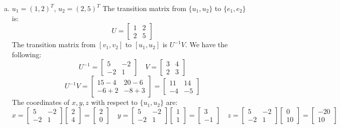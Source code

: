 \documentclass{article}
\begin{document}
\begin{enumerate}[(a)]
    \item
    $u_1 = (1,2)^T$, $u_2 = (2,5)^T$
    The transition matrix from $\{u_1, u_2\}$ to $\{e_1, e_2\}$ is:
    $$ U = \begin{bmatrix} 1 & 2 \\ 2 & 5 \end{bmatrix} $$
    The transition matrix from $[v_1, v_2]$ to $[u_1, u_2]$ is $U^{-1}V$.
    We have the following:
    $$ U^{-1} = \begin{bmatrix} 5 & -2 \\ -2 & 1 \end{bmatrix} \quad
    V = \begin{bmatrix} 3 & 4 \\ 2 & 3 \end{bmatrix} $$
    $$ U^{-1}V = \begin{bmatrix} 15-4 & 20-6 \\ -6+2 & -8+3 \end{bmatrix} = 
    \begin{bmatrix} 11 & 14 \\ -4 & -5 \end{bmatrix} $$
    The coordinates of $x, y, z$ with respect to $\{u_1, u_2\}$ are:
    $$
    x = \begin{bmatrix} 5 & -2 \\ -2 & 1 \end{bmatrix} \begin{bmatrix} 2 \\ 4 \end{bmatrix}
     = \begin{bmatrix} 2 \\ 0 \end{bmatrix}
    \quad
    y = \begin{bmatrix} 5 & -2 \\ -2 & 1 \end{bmatrix} \begin{bmatrix} 1 \\ 1 \end{bmatrix}
     = \begin{bmatrix} 3 \\ -1 \end{bmatrix}
    \quad
    z = \begin{bmatrix} 5 & -2 \\ -2 & 1 \end{bmatrix} \begin{bmatrix} 0 \\ 10 \end{bmatrix}
     = \begin{bmatrix} -20 \\ 10 \end{bmatrix}
$$
\end{enumerate}
\end{document}
